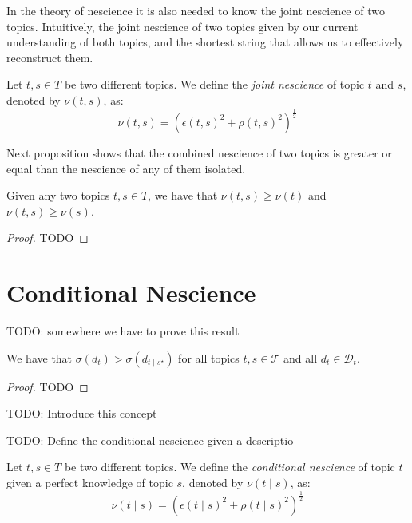 In the theory of nescience it is also needed to know the joint nescience of two topics. Intuitively, the joint nescience of two topics given by our current understanding of both topics, and the shortest string that allows us to effectively reconstruct them.

\begin{definition}
Let $t,s \in T$ be two different topics. We define the \emph{joint nescience} of topic $t$ and $s$, denoted by $\nu(t,s)$, as: 
\[
\nu(t, s) = \left( \epsilon\left( t, s \right)^2 + \rho\left( t,s \right)^2 \right) ^ \frac{1}{2}
\]
\end{definition}

Next proposition shows that the combined nescience of two topics is greater or equal than the nescience of any of them isolated.

\begin{proposition}
Given any two topics $t,s \in T$, we have that $\nu(t,s) \geq \nu(t)$ and $\nu(t,s) \geq \nu(s)$.
\end{proposition}
\begin{proof}
{\color{red}TODO}
\end{proof}

%
%

\section{Conditional Nescience}

{\color{red} TODO: somewhere we have to prove this result}

\begin{proposition}
We have that $\sigma(d_t) > \sigma(d_{t \mid s^\star})$ for all topics $t,s \in \mathcal{T}$ and all $d_t \in \mathcal{D}_t$.
\end{proposition}
\begin{proof}
{\color{red} TODO}
\end{proof}

{\color{red} TODO: Introduce this concept}

{\color{red} TODO: Define the conditional nescience given a descriptio}

\begin{definition} Let $t,s\in T$ be two different topics. We define the \emph{conditional nescience} of topic $t$ given a perfect knowledge of topic $s$, denoted by $\nu( t \mid s)$, as: 
\[
\nu(t \mid s) = \left( \epsilon\left( t \mid s \right)^2 + \rho\left( t \mid s \right)^2 \right) ^ \frac{1}{2}
\]
\end{definition}

